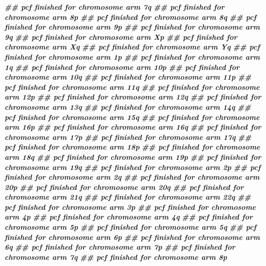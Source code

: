 \documentclass[
  12pt,
  a4paper,
  twoside]{book}
\newenvironment{Shaded}{\begin{snugshade}}{\end{snugshade}}
\newcommand{\DocumentationTok}[1]{\textcolor[rgb]{0.56,0.35,0.01}{\textbf{\textit{#1}}}}
\begin{document}
\begin{Shaded}
\begin{Highlighting}[]
\DocumentationTok{\#\# pcf finished for chromosome arm 7q }
\DocumentationTok{\#\# pcf finished for chromosome arm 8p }
\DocumentationTok{\#\# pcf finished for chromosome arm 8q }
\DocumentationTok{\#\# pcf finished for chromosome arm 9p }
\DocumentationTok{\#\# pcf finished for chromosome arm 9q }
\DocumentationTok{\#\# pcf finished for chromosome arm Xp }
\DocumentationTok{\#\# pcf finished for chromosome arm Xq }
\DocumentationTok{\#\# pcf finished for chromosome arm Yq }
\DocumentationTok{\#\# pcf finished for chromosome arm 1p }
\DocumentationTok{\#\# pcf finished for chromosome arm 1q }
\DocumentationTok{\#\# pcf finished for chromosome arm 10p }
\DocumentationTok{\#\# pcf finished for chromosome arm 10q }
\DocumentationTok{\#\# pcf finished for chromosome arm 11p }
\DocumentationTok{\#\# pcf finished for chromosome arm 11q }
\DocumentationTok{\#\# pcf finished for chromosome arm 12p }
\DocumentationTok{\#\# pcf finished for chromosome arm 12q }
\DocumentationTok{\#\# pcf finished for chromosome arm 13q }
\DocumentationTok{\#\# pcf finished for chromosome arm 14q }
\DocumentationTok{\#\# pcf finished for chromosome arm 15q }
\DocumentationTok{\#\# pcf finished for chromosome arm 16p }
\DocumentationTok{\#\# pcf finished for chromosome arm 16q }
\DocumentationTok{\#\# pcf finished for chromosome arm 17p }
\DocumentationTok{\#\# pcf finished for chromosome arm 17q }
\DocumentationTok{\#\# pcf finished for chromosome arm 18p }
\DocumentationTok{\#\# pcf finished for chromosome arm 18q }
\DocumentationTok{\#\# pcf finished for chromosome arm 19p }
\DocumentationTok{\#\# pcf finished for chromosome arm 19q }
\DocumentationTok{\#\# pcf finished for chromosome arm 2p }
\DocumentationTok{\#\# pcf finished for chromosome arm 2q }
\DocumentationTok{\#\# pcf finished for chromosome arm 20p }
\DocumentationTok{\#\# pcf finished for chromosome arm 20q }
\DocumentationTok{\#\# pcf finished for chromosome arm 21q }
\DocumentationTok{\#\# pcf finished for chromosome arm 22q }
\DocumentationTok{\#\# pcf finished for chromosome arm 3p }
\DocumentationTok{\#\# pcf finished for chromosome arm 4p }
\DocumentationTok{\#\# pcf finished for chromosome arm 4q }
\DocumentationTok{\#\# pcf finished for chromosome arm 5p }
\DocumentationTok{\#\# pcf finished for chromosome arm 5q }
\DocumentationTok{\#\# pcf finished for chromosome arm 6p }
\DocumentationTok{\#\# pcf finished for chromosome arm 6q }
\DocumentationTok{\#\# pcf finished for chromosome arm 7p }
\DocumentationTok{\#\# pcf finished for chromosome arm 7q }
\DocumentationTok{\#\# pcf finished for chromosome arm 8p }

\end{Highlighting}
\end{Shaded}
\end{document}
